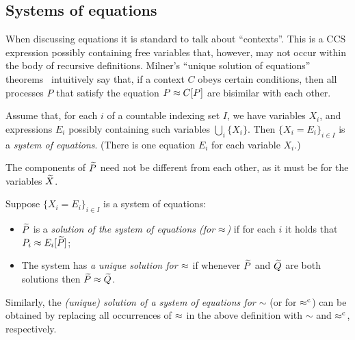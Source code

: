 \subsection{Systems of equations}
\label{ss:SysEq}
When discussing equations it is standard to talk about ``contexts''. This is
a CCS expression possibly containing free variables that, however, may not occur within
the body of recursive definitions. 
Milner's ``unique solution of equations'' theorems~\cite{Mil89} intuitively
say that, if a context $C$
obeys certain conditions,
then all processes $P$ that satisfy the equation $P \approx C [P]$ are
bisimilar with each other.

\begin{definition}[equations] %
  \label{def:equation}
Assume that, for each $i$ of 
 a countable indexing set $I$, we have variables $X_i$, and expressions
$E_i$ possibly containing such variables $\bigcup_i \{ X_i\}$. Then 
$\{ X_i = E_i\}_{i\in I}$ is 
  a \emph{system of equations}. (There is one equation $E_i$ for each variable $X_i$.)
\end{definition}

The components of $\widetilde P$ need not be
different from each other, as it must be for the variables $\widetilde X$.

\begin{definition}
  \label{def:solution}
Suppose $\{ X_i = E_i\}_{i\in I}$ is a system of equations: 
\begin{itemize}
\item
 $\widetilde P$ is a \emph{solution of the system of equations (for $\approx$)} 
if for each $i$ it holds that $P_i \approx E_i [\widetilde P]$;
\item The system has \emph{a unique solution for $\approx$}  if whenever 
 $\widetilde P$ and $\widetilde Q$ are both solutions then $\widetilde P \approx \widetilde Q$. 
\end{itemize} 
 \end{definition}
 Similarly, %
the \emph{(unique) solution of a system of equations for $\sim$}
(or for $\mathrel{\approx^{\rm{c}}}$) can be obtained by replacing all occurrences of $\approx$
in the above definition with $\sim$ and $\mathrel{\approx^{\rm{c}}}$, respectively.


